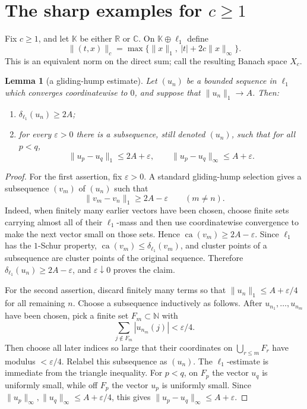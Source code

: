 \documentclass[11pt]{article}
\newtheorem{lemma}{Lemma}
\newcommand{\K}{\mathbb K}
\newcommand{\N}{\mathbb N}
\newcommand{\ellone}{\ell_1}
\newcommand{\ca}{\operatorname{ca}}
\begin{document}
\section*{The sharp examples for \(c\ge1\)}

Fix \(c\ge1\), and let \(\K\) be either \(\mathbb R\) or \(\mathbb C\).  On
\(\K\oplus\ellone\) define
\[
  \|(t,x)\|_c
  =
  \max\bigl\{\|x\|_1,\ |t|+2c\|x\|_\infty\bigr\}.
\]
This is an equivalent norm on the direct sum; call the resulting Banach space
\(X_c\).

\begin{lemma}[a gliding-hump estimate]\label{lem:gliding}
Let \((u_n)\) be a bounded sequence in \(\ellone\) which converges
coordinatewise to \(0\), and suppose that \(\|u_n\|_1\to A\).  Then:
\begin{enumerate}
\item \(\delta_{\ellone}(u_n)\ge 2A\);
\item for every \(\varepsilon>0\) there is a subsequence, still denoted
      \((u_n)\), such that for all \(p<q\),
      \[
        \|u_p-u_q\|_1\le 2A+\varepsilon,
        \qquad
        \|u_p-u_q\|_\infty\le A+\varepsilon .
      \]
\end{enumerate}
\end{lemma}

\begin{proof}
For the first assertion, fix \(\varepsilon>0\).  A standard gliding-hump
selection gives a subsequence \((v_m)\) of \((u_n)\) such that
\[
  \|v_m-v_n\|_1\ge 2A-\varepsilon\qquad(m\ne n).
\]
Indeed, when finitely many earlier vectors have been chosen, choose finite
sets carrying almost all of their \(\ellone\)-mass and then use coordinatewise
convergence to make the next vector small on those sets.  Hence
\(\ca(v_m)\ge2A-\varepsilon\).  Since \(\ellone\) has the \(1\)-Schur
property, \(\ca(v_m)\le\delta_{\ellone}(v_m)\), and cluster points of a
subsequence are cluster points of the original sequence.  Therefore
\(\delta_{\ellone}(u_n)\ge2A-\varepsilon\), and \(\varepsilon\downarrow0\)
proves the claim.

For the second assertion, discard finitely many terms so that
\(\|u_n\|_1\le A+\varepsilon/4\) for all remaining \(n\).  Choose a subsequence
inductively as follows.  After \(u_{n_1},\dots,u_{n_m}\) have been chosen, pick
a finite set \(F_m\subset\N\) with
\[
  \sum_{j\notin F_m}|u_{n_m}(j)|<\varepsilon/4.
\]
Then choose all later indices so large that their coordinates on
\(\bigcup_{r\le m}F_r\) have modulus \(<\varepsilon/4\).  Relabel this
subsequence as \((u_n)\).  The \(\ellone\)-estimate is immediate from the
triangle inequality.  For \(p<q\), on \(F_p\) the vector \(u_q\) is uniformly
small, while off \(F_p\) the vector \(u_p\) is uniformly small.  Since
\(\|u_p\|_\infty,\|u_q\|_\infty\le A+\varepsilon/4\), this gives
\(\|u_p-u_q\|_\infty\le A+\varepsilon\).
\end{proof}
\end{document}
